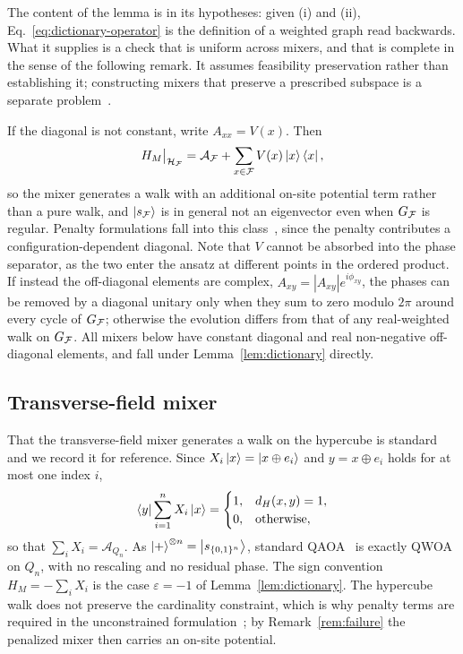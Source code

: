 The content of the lemma is in its hypotheses: given (i) and (ii),
Eq.~\eqref{eq:dictionary-operator} is the definition of a weighted graph read
backwards. What it supplies is a check that is uniform across mixers, and that
is complete in the sense of the following remark. It assumes feasibility
preservation rather than establishing it; constructing mixers that preserve a
prescribed subspace is a separate problem~\cite{Fuchs2022,Fuchs2024}.

\begin{remark}  
\label{rem:failure}
If the diagonal is not constant, write $A_{xx}=V(x)$. Then
\begin{equation}
    H_M\big|_{\mathcal{H}_{\mathcal{F}}}
    =
    \mathcal{A}_{\mathcal{F}}+\sum_{x\in\mathcal{F}}V(x)\ket{x}\bra{x},
    \label{eq:potential}
\end{equation}
so the mixer generates a walk with an additional on-site potential term rather
than a pure walk, and $\ket{s_{\mathcal{F}}}$ is in general not an eigenvector even
when $G_{\mathcal{F}}$ is regular. Penalty formulations fall into this
class~\cite{Lucas2014}, since the penalty contributes a
configuration-dependent diagonal. Note that $V$ cannot be absorbed into the
phase separator, as the two enter the ansatz at different points in the
ordered product. If instead the off-diagonal elements are complex,
$A_{xy}=|A_{xy}|e^{i\phi_{xy}}$, the phases can be removed by a diagonal
unitary only when they sum to zero modulo $2\pi$ around every cycle of
$G_{\mathcal{F}}$; otherwise the evolution differs from that of any real-weighted walk
on $G_{\mathcal{F}}$. All mixers below have constant diagonal and real non-negative
off-diagonal elements, and fall under Lemma~\ref{lem:dictionary} directly.
\end{remark}

\subsection{\label{subsec:transverse}Transverse-field mixer}

That the transverse-field mixer generates a walk on the hypercube is
standard~\cite{Marsh2019,Marsh2020,Slate2021,Matwiejew2024} and we record it
for reference. Since $X_i\ket{x}=\ket{x\oplus e_i}$ and $y=x\oplus e_i$ holds
for at most one index $i$,
\begin{equation}
    \bra{y}\sum_{i=1}^{n}X_i\ket{x}
    =
    \begin{cases}
        1, & d_H(x,y)=1,\\
        0, & \text{otherwise},
    \end{cases}
    \label{eq:hypercube}
\end{equation}
so that $\sum_i X_i=\mathcal{A}_{Q_n}$. As
$\ket{+}^{\otimes n}=\ket{s_{\{0,1\}^n}}$, standard QAOA~\cite{Farhi2014} is
exactly QWOA on $Q_n$, with no rescaling and no residual phase. The sign
convention $H_M=-\sum_i X_i$ is the case $\varepsilon=-1$ of
Lemma~\ref{lem:dictionary}. The hypercube walk does not preserve the
cardinality constraint, which is why penalty terms are required in the
unconstrained formulation~\cite{Lucas2014,Hodson2019}; by
Remark~\ref{rem:failure} the penalized mixer then carries an on-site potential.

